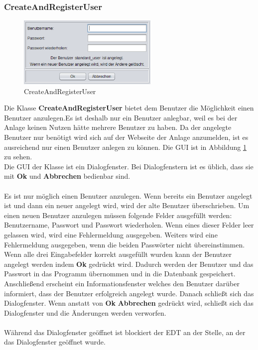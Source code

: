 \subsubsection{CreateAndRegisterUser}
\begin{figure}
\vspace{-20pt}
  \begin{center}
    \includegraphics[width=0.60\textwidth]{Bilder/GUI/CreateUser}
  \end{center}
  \caption{CreateAndRegisterUser}
  \label{CreateAndRegisterUser}
  \vspace{-10pt}
\end{figure}
Die Klasse \textbf{CreateAndRegisterUser} bietet dem Benutzer die Möglichkeit einen Benutzer anzulegen.Es ist deshalb nur ein Benutzer anlegbar, weil es bei der Anlage keinen Nutzen hätte mehrere Benutzer zu haben. Da der angelegte Benutzer nur benötigt wird sich auf der Webseite der Anlage anzumelden, ist es ausreichend nur einen Benutzer anlegen zu können. Die GUI ist in Abbildung \ref{CreateAndRegisterUser} zu sehen.
\\ Die GUI der Klasse ist ein Dialogfenster. Bei Dialogfenstern ist es üblich, dass sie mit \textbf{Ok} und \textbf{Abbrechen} bedienbar sind.
\\ \\ Es ist nur möglich einen Benutzer anzulegen. Wenn bereits ein Benutzer angelegt ist und dann ein neuer angelegt wird, wird der alte Benutzer überschrieben. Um einen neuen Benutzer anzulegen müssen folgende Felder ausgefüllt werden: Benutzername, Passwort und Passwort wiederholen. Wenn eines dieser Felder leer gelassen wird, wird eine Fehlermeldung ausgegeben. Weiters wird eine Fehlermeldung ausgegeben, wenn die beiden Passwörter nicht übereinstimmen. Wenn alle drei Eingabefelder korrekt ausgefüllt wurden kann der Benutzer angelegt werden indem \textbf{Ok} gedrückt wird. Dadurch werden der Benutzer und das Passwort in das Programm übernommen und in die Datenbank gespeichert. Anschließend erscheint ein Informationsfenster welches den Benutzer darüber informiert, dass der Benutzer erfolgreich angelegt wurde. Danach schließt sich das Dialogfenster. Wenn anstatt von \textbf{Ok} \textbf{Abbrechen} gedrückt wird, schließt sich das Dialogfenster und die Änderungen werden verworfen.
\\ \\ Während das Dialogfenster geöffnet ist blockiert der EDT an der Stelle, an der das Dialogfenster geöffnet wurde.

